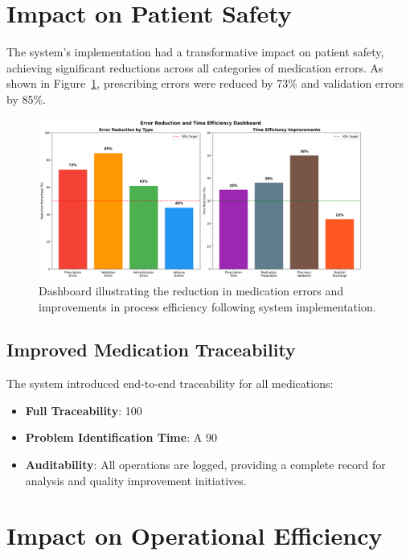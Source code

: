 \section{Impact on Patient Safety}

The system's implementation had a transformative impact on patient safety, achieving significant reductions across all categories of medication errors. As shown in Figure~\ref{fig:error-reduction}, prescribing errors were reduced by 73\% and validation errors by 85\%.

\begin{figure}[htbp]
    \centering
    \includegraphics[width=0.95\textwidth]{images/generated/error_reduction_dashboard.png}
    \caption{Dashboard illustrating the reduction in medication errors and improvements in process efficiency following system implementation.}
    \label{fig:error-reduction}
\end{figure}

\subsection{Improved Medication Traceability}

The system introduced end-to-end traceability for all medications:
\begin{itemize}
    \item \textbf{Full Traceability}: 100%
    \item \textbf{Problem Identification Time}: A 90%
    \item \textbf{Auditability}: All operations are logged, providing a complete record for analysis and quality improvement initiatives.
\end{itemize}

\section{Impact on Operational Efficiency}


